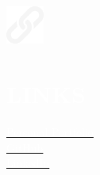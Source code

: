 \documentclass[../main.tex]{subfiles}
\begin{document}
    \hspace*{0.2cm}
    \begin{minipage}[t]{2.1cm}
        \vspace*{0.9cm}\includegraphics[width=1.25cm]{assets/link.png}
    \end{minipage}
    \begin{minipage}[t]{4.9cm}

        \vspace*{0.5cm}
        \section*{\textcolor{white}{LINKS}}
        \vspace*{-0.25cm}
        \textcolor{white}{
            \vspace*{0.1cm}\underline{\href{https://albatalaya.github.io/}{\textcolor{white}{Personal Portfolio}}} \\
            \vspace*{0.1cm}\underline{\href{https://www.github.com/albatalaya}{\textcolor{white}{GitHub}}}\\
            \underline{\href{https://www.linkedin.com/in/albatalaya}{\textcolor{white}{LinkedIn}}}
        }
    \end{minipage}
\end{document}
